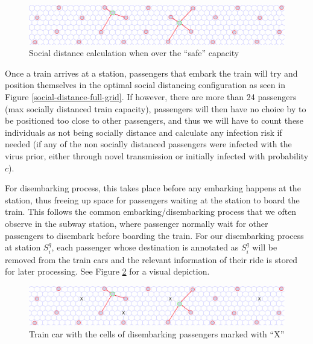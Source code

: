 \documentclass[12pt]{article}
\begin{document}
\begin{figure}[h]
\centering
\includegraphics[scale=.45]{./figures/hex-train-full-unsafe.png}
\caption{Social distance calculation when over the ``safe'' capacity}
\label{social-distance-unsafe-car}
\end{figure}

Once a train arrives at a station, passengers that embark the train will try and position themselves in the optimal social distancing configuration as seen in Figure \ref{social-distance-full-grid}.
If however, there are more than 24 passengers (max socially distanced train capacity), passengers will then have no choice by to be positioned too close to other passengers, and thus we will have to count these individuals as not being socially distance and calculate any infection risk if needed (if any of the non socially distanced passengers were infected with the virus prior, either through novel transmission or initially infected with probability $c$).

For disembarking process, this takes place before any embarking happens at the station, thus freeing up space for passengers waiting at the station to board the train.
This follows the common embarking/disembarking process that we often observe in the subway station, where passenger normally wait for other passengers to disembark before boarding the train.
For our disembarking process at station $S_i^q$, each passenger whose destination is annotated as $S_i^q$ will be removed from the train cars and the relevant information of their ride is stored for later processing.
See Figure \ref{social-distance-disembark} for a visual depiction.

\begin{figure}[h]
	\centering
	\includegraphics[scale=.45]{./figures/hex-train-disembark.png}
	\caption{Train car with the cells of disembarking passengers marked with ``X''}
	\label{social-distance-disembark}
\end{figure}
\end{document}
